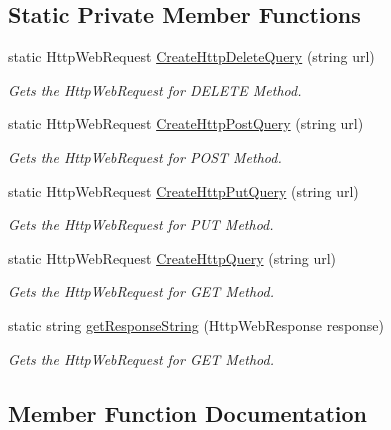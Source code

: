 \subsection*{Static Private Member Functions}
\begin{DoxyCompactItemize}
\item 
static Http\+Web\+Request \hyperlink{classWildlifeTrackingApp_1_1Utility_1_1HttpUtil_a6899e5d7ebdcb05fc36e7a579c5b8e97}{Create\+Http\+Delete\+Query} (string url)
\begin{DoxyCompactList}\small\item\em Gets the Http\+Web\+Request for D\+E\+L\+E\+TE Method. \end{DoxyCompactList}\item 
static Http\+Web\+Request \hyperlink{classWildlifeTrackingApp_1_1Utility_1_1HttpUtil_a1f86d667d86279bb3acaa93b36fc4ba1}{Create\+Http\+Post\+Query} (string url)
\begin{DoxyCompactList}\small\item\em Gets the Http\+Web\+Request for P\+O\+ST Method. \end{DoxyCompactList}\item 
static Http\+Web\+Request \hyperlink{classWildlifeTrackingApp_1_1Utility_1_1HttpUtil_afcce3cdfd6d09ae71bac6fb4039fb912}{Create\+Http\+Put\+Query} (string url)
\begin{DoxyCompactList}\small\item\em Gets the Http\+Web\+Request for P\+UT Method. \end{DoxyCompactList}\item 
static Http\+Web\+Request \hyperlink{classWildlifeTrackingApp_1_1Utility_1_1HttpUtil_a4a1b80ad5a1cebbdd0380f4881fa5167}{Create\+Http\+Query} (string url)
\begin{DoxyCompactList}\small\item\em Gets the Http\+Web\+Request for G\+ET Method. \end{DoxyCompactList}\item 
static string \hyperlink{classWildlifeTrackingApp_1_1Utility_1_1HttpUtil_aa05c03695bc80bba86ecb6305eae2fc2}{get\+Response\+String} (Http\+Web\+Response response)
\begin{DoxyCompactList}\small\item\em Gets the Http\+Web\+Request for G\+ET Method. \end{DoxyCompactList}\end{DoxyCompactItemize}


\subsection{Member Function Documentation}
\mbox{\label{classWildlifeTrackingApp_1_1Utility_1_1HttpUtil_a6899e5d7ebdcb05fc36e7a579c5b8e97}} 
